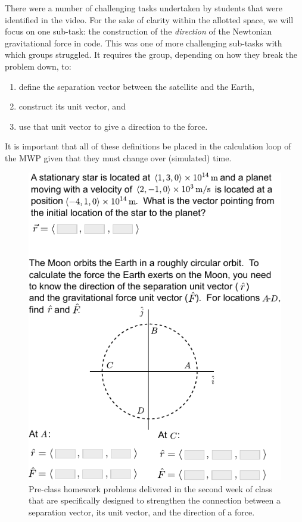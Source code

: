 \documentclass{msuphddissertation}
\begin{document}
\begin{doublespace}
There were a number of challenging tasks undertaken by students that were identified in the video.  For the sake of clarity within the allotted space, we will focus on one sub-task: the construction of the \textit{direction} of the Newtonian gravitational force in code.  This was one of more challenging sub-tasks with which groups struggled.  It requires the group, depending on how they break the problem down, to:
\begin{enumerate}
  \item
  define the separation vector between the satellite and the Earth,
  \item construct its unit vector, and
  \item use that unit vector to give a direction to the force.
\end{enumerate}
It is important that all of these definitions be placed in the calculation loop of the MWP given that they must change over (simulated) time.

\begin{figure}[ht]
\includegraphics[width=0.8\linewidth]{./images/hw.pdf}
\caption{Pre-class homework problems delivered in the second week of class that are specifically designed to strengthen the connection between a separation vector, its unit vector, and the direction of a force.\label{unit_hw}}
\end{figure}


\end{doublespace}
\end{document}

